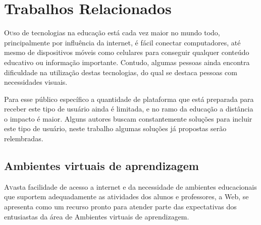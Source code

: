 \chapter{Trabalhos Relacionados} \label{chap:Trabalhos}
\lettrine{O} uso de tecnologias na educação está cada vez maior no mundo todo, principalmente por influência da internet, 
é fácil conectar computadores, até mesmo de dispositivos móveis como celulares para  conseguir qualquer conteúdo educativo ou 
informação importante. Contudo, algumas pessoas ainda encontra dificuldade na utilização destas tecnologias, do qual se destaca 
pessoas com necessidades visuais.

Para esse público específico a quantidade de plataforma que está preparada para receber este tipo de usuário ainda é limitada, e no 
ramo da educação a distância o impacto é maior.
Alguns autores buscam constantemente soluções para incluir este tipo de usuário, neste trabalho algumas soluções já propostas
serão relembradas.


\section{Ambientes virtuais de aprendizagem}
\lettrine{A} vasta facilidade de acesso a internet e da necessidade de ambientes educacionais que suportem 
adequadamente as atividades dos alunos e professores, a Web, se apresenta como um recurso pronto para atender 
parte das expectativas dos entusiastas da área de Ambientes virtuais de aprendizagem.

